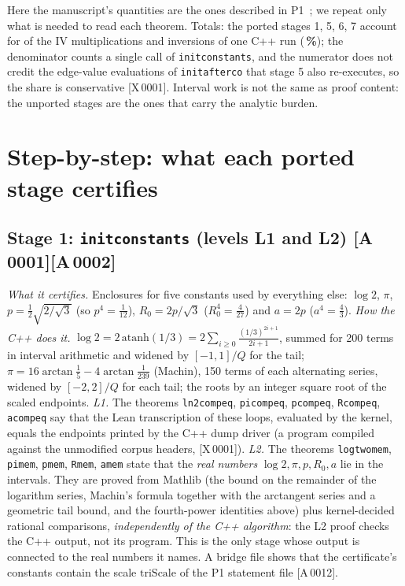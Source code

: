 \documentclass[10pt]{article}
\newcommand{\tg}[2]{\texorpdfstring{\textsf{[#1\,#2]}}{}}  %
\newcommand{\lean}[1]{\texttt{#1}}
\renewcommand{\_}{\textunderscore\allowbreak}
\begin{document}
Here the manuscript's quantities are the ones described in P1~\cite{p1}; we repeat only what is needed to read each theorem. Totals: the ported stages 1, 5, 6, 7 account for \PTDoneOps{} of the \PTTotalOps{}
IV multiplications and inversions of one C++ run (\textbf{\PTFrac\,\%}); the denominator counts a single call of \lean{init\_constants}, and the numerator does not credit the edge-value evaluations of \lean{init\_after\_co}
that stage 5 also re-executes, so the share is conservative \tg{X}{0001}. Interval work is not the same as proof content: the unported stages are the ones that carry the analytic burden.

\section{Step-by-step: what each ported stage certifies}\label{sec:stages}
\subsection{Stage 1: \lean{init\_constants} (levels L1 and L2) \tg{A}{0001}\tg{A}{0002}}
\emph{What it certifies.} Enclosures for five constants used by everything else: $\log 2$, $\pi$, $p=\tfrac12\sqrt{2/\sqrt3}$ (so $p^4=\tfrac1{12}$), $R_0=2p/\sqrt3$ ($R_0^4=\tfrac4{27}$) and $a=2p$ ($a^4=\tfrac43$).
\emph{How the C++ does it.} $\log 2=2\,\mathrm{atanh}(1/3)=2\sum_{i\ge0}\frac{(1/3)^{2i+1}}{2i+1}$, summed for 200 terms in interval arithmetic and widened by $[-1,1]/Q$ for the tail; $\pi=16\arctan\frac15-4\arctan\frac1{239}$ (Machin), 150 terms of each alternating series, widened by $[-2,2]/Q$ for each tail; the roots by an integer square root of the scaled endpoints.
\emph{L1.} The theorems \lean{ln2\_comp\_eq}, \lean{pi\_comp\_eq}, \lean{p\_comp\_eq}, \lean{R\_comp\_eq}, \lean{a\_comp\_eq} say that the Lean transcription of these loops, evaluated by the kernel, equals the endpoints printed by the C++ dump driver (a program compiled against the unmodified corpus headers, \tg{X}{0001}).
\emph{L2.} The theorems \lean{log\_two\_mem}, \lean{pi\_mem}, \lean{p\_mem}, \lean{R\_mem}, \lean{a\_mem} state that the \emph{real numbers} $\log 2,\pi,p,R_0,a$ lie in the intervals. They are proved from Mathlib (the bound on the remainder of the logarithm series, Machin's formula together with the arctangent series and a geometric tail bound, and the fourth-power identities above) plus kernel-decided rational comparisons, \emph{independently of the C++ algorithm}: the L2 proof checks the C++ output, not its program. This is the only stage whose output is connected to the real numbers it names. A bridge file shows that the certificate's constants contain the scale $\mathrm{triScale}$ of the P1 statement file \tg{A}{0012}.
\end{document}
